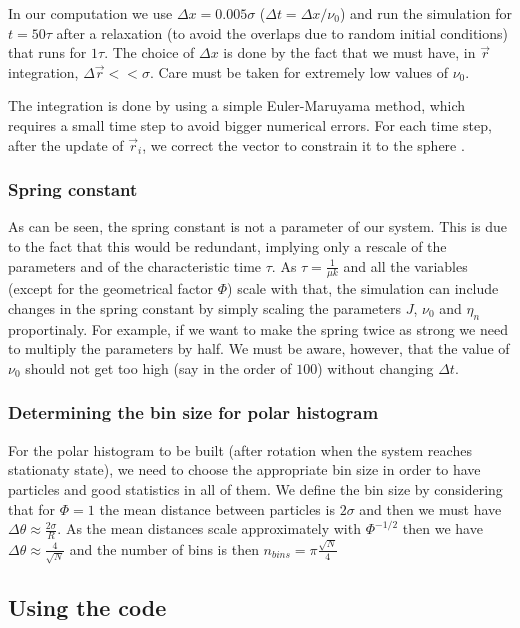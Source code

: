\documentclass[12pt]{article}
\begin{document}
In our computation we use $\Delta x = 0.005 \sigma$ ($\Delta t = \Delta x/\nu_0$) and run the simulation for $t=50 \tau$ after a relaxation (to avoid the overlaps due to random initial conditions) that runs for $1 \tau$. The choice of $\Delta x$ is done by the fact that we must have, in $\vec{r}$ integration, $\Delta \vec{r} << \sigma$. Care must be taken for extremely low values of $\nu_0$.

The integration is done by using a simple Euler-Maruyama method, which requires a small time step to avoid bigger numerical errors. For each time step, after the update of $\vec{r}_i$, we correct the vector to constrain it to the sphere \cite{Sknepnek2014}.

\subsubsection{Spring constant}

As can be seen, the spring constant is not a parameter of our system. This is due to the fact that this would be redundant, implying only a rescale of the parameters and of the characteristic time $\tau$. As $\tau = \frac{1}{\mu k}$ and all the variables (except for the geometrical factor $\Phi$) scale with that, the simulation can include changes in the spring constant by simply scaling the parameters $J$, $\nu_0$ and $\eta_n$ proportinaly. For example, if we want to make the spring twice as strong we need to multiply the parameters by half. We must be aware, however, that the value of $\nu_0$ should not get too high (say in the order of $100$) without changing $\Delta t$.

\subsubsection{Determining the bin size for polar histogram}

For the polar histogram to be built (after rotation when the system reaches stationaty state), we need to choose the appropriate bin size in order to have particles and good statistics in all of them. We define the bin size by considering that for $\Phi=1$ the mean distance between particles is $2\sigma$ and then we must have $\Delta \theta \approx \frac{2\sigma}{R}$. As the mean distances scale approximately with $\Phi^{-1/2}$ then we have $\Delta \theta \approx \frac{4}{\sqrt{N}}$ and the number of bins is then $n_{bins} = \pi \frac{\sqrt{N}}{4}$

\subsection{Using the code}
\end{document}
